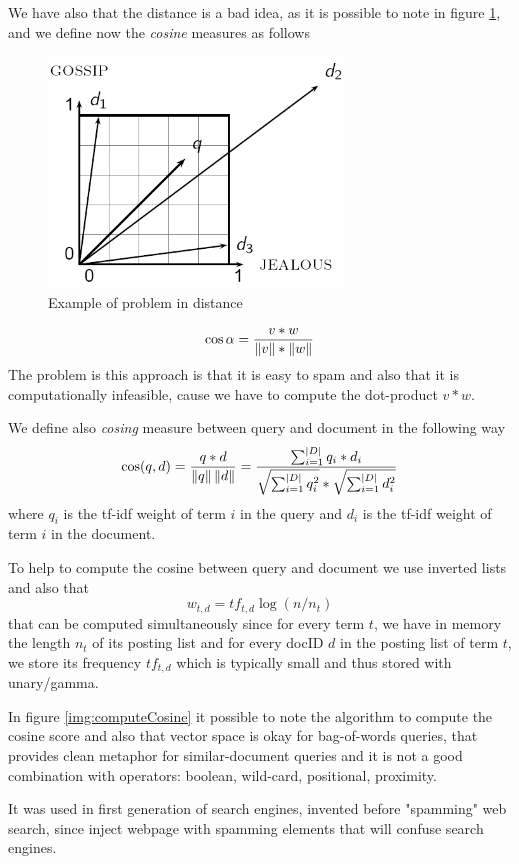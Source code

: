 We have also that the distance is a bad idea, as it is possible to note in figure \ref{img:exDistance}, and we define
now the \emph{cosine} measures as follows
\begin{figure}
	\includegraphics[width=0.7\textwidth]{Images/distanceProblem}
	\caption{Example of problem in distance}
	\label{img:exDistance}
\end{figure}
\[ \cos \alpha = \frac{v * w}{\left\lVert v\right\rVert * \left\lVert w\right\rVert} \]
The problem is this approach is that it is easy to spam and also that it is computationally infeasible,
cause we have to compute the dot-product $v * w$.

We define also \emph{cosing} measure between query and document in the following way
\[ \cos(q, d) = \frac{q * d}{\left\lVert q\right\rVert \left\lVert d\right\rVert} = \frac{\sum _{i=1}^{|D|} q_i * d_i}{\sqrt{\sum_{i=1}^{|D|} q_i^2} * \sqrt{\sum _{i=1}^{|D|} d_i^2}} \]
where $q_i$ is the tf-idf weight of term $i$ in the query and $d_i$ is the tf-idf weight of term $i$ in the document.

To help to compute the cosine between query and document we use inverted lists and also that
\[ w_{t, d} = tf_{t, d} \log (n / n_t) \]
that can be computed simultaneously since for every term $t$, we have in memory the length $n_t$ of its posting list and for 
every docID $d$ in the posting list of term $t$, we store its frequency $tf_{t, d}$ which is typically small and 
thus stored with unary/gamma.

In figure \ref{img:computeCosine} it possible to note the algorithm to compute the cosine score and also that 
vector space is okay for bag-of-words queries, that provides clean metaphor for similar-document queries and 
it is not a good combination with operators: boolean, wild-card, positional, proximity.

It was used in first generation of search engines, invented before "spamming" web search, since 
inject webpage with spamming elements that will confuse search engines.

